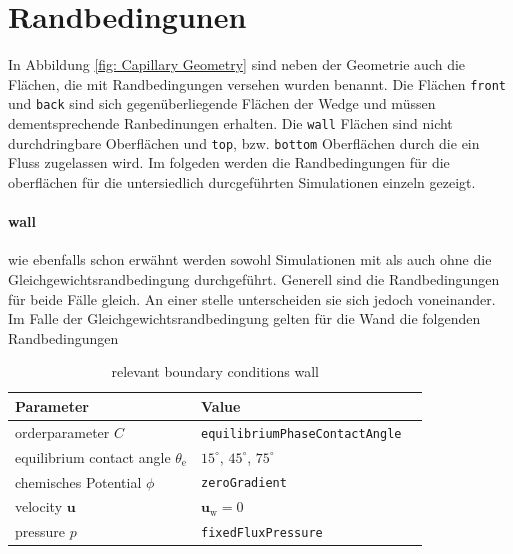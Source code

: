 \section{Randbedingunen}
In Abbildung \ref{fig: Capillary Geometry} sind neben der Geometrie auch die Flächen, die mit Randbedingungen versehen wurden benannt. Die Flächen \texttt{front} und \texttt{back} sind sich gegenüberliegende Flächen der Wedge und müssen dementsprechende Ranbedinungen erhalten. Die \texttt{wall} Flächen sind nicht durchdringbare Oberflächen und \texttt{top}, bzw. \texttt{bottom} Oberflächen durch die ein Fluss zugelassen wird.
Im folgeden werden die Randbedingungen für die oberflächen für die untersiedlich durcgeführten Simulationen einzeln gezeigt.
\paragraph{wall}
wie ebenfalls schon erwähnt werden sowohl Simulationen mit als auch ohne die Gleichgewichtsrandbedingung durchgeführt. Generell sind die Randbedingungen für beide Fälle gleich. An einer stelle unterscheiden sie sich jedoch voneinander. 
Im Falle der Gleichgewichtsrandbedingung gelten für die Wand die folgenden Randbedingungen

\begin{table}[h]
    \centering
        \caption{relevant boundary conditions wall}
        \label{tab: BoandaryConditions_wall}
        \begin{tabular}{lll}
            Parameter & Value \\ \hline
            orderparameter $C$ & \texttt{equilibriumPhaseContactAngle}     \\
            equilibrium contact angle $\theta_{\mathrm{e}}$ & $15^{\circ}$, $45^{\circ}$, $75^{\circ}$\\
            chemisches Potential $\phi$   & \texttt{zeroGradient}        \\ 
            velocity $\mathbf{u}$ &   $\mathbf{u_{\mathrm{w}}} = 0$\\
            pressure $p$&  \texttt{fixedFluxPressure} \\
        \end{tabular}
\end{table}